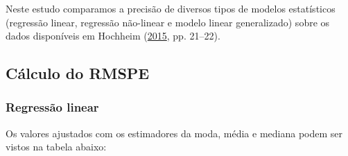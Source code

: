 \documentclass[a4paper]{article}
\begin{document}
Neste estudo comparamos a precisão de diversos tipos de modelos
estatísticos (regressão linear, regressão não-linear e modelo linear
generalizado) sobre os dados disponíveis em Hochheim
(\protect\hyperlink{ref-hochheim}{2015}, pp. 21--22).

\subsection{Cálculo do RMSPE}\label{calculo-do-rmspe}

\subsubsection{Regressão linear}\label{regressao-linear-2}

Os valores ajustados com os estimadores da moda, média e mediana podem
ser vistos na tabela abaixo:
\end{document}
